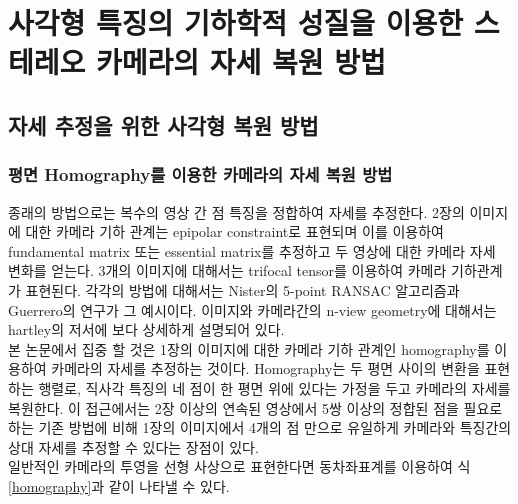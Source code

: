 \documentclass[master,korean,final]{cbnu-ecs}
\begin{document}
\newpage
\chapter{사각형 특징의 기하학적 성질을 이용한 스테레오 카메라의 자세 복원 방법}

\section{자세 추정을 위한 사각형 복원 방법}
\subsection{평면 Homography를 이용한 카메라의 자세 복원 방법}

종래의 방법으로는 복수의 영상 간 점 특징을 정합하여 자세를 추정한다. 2장의 이미지에 대한 카메라 기하 관계는 epipolar constraint로 표현되며 이를 이용하여 fundamental matrix 또는 essential matrix를 추정하고 두 영상에 대한 카메라 자세 변화를 얻는다. 3개의 이미지에 대해서는 trifocal tensor를 이용하여 카메라 기하관계가 표현된다. 각각의 방법에 대해서는 Nister의 5-point RANSAC 알고리즘\cite{Nister2005}과 Guerrero의 연구\cite{Guerrero2008}가 그 예시이다. 이미지와 카메라간의 n-view geometry에 대해서는 hartley의 저서\cite{Hartley2003}에 보다 상세하게 설명되어 있다.\\
본 논문에서 집중 할 것은 1장의 이미지에 대한 카메라 기하 관계인 homography를 이용하여 카메라의 자세를 추정하는 것이다. Homography는 두 평면 사이의 변환을 표현하는 행렬로, 직사각 특징의 네 점이 한 평면 위에 있다는 가정을 두고 카메라의 자세를 복원한다. 이 접근에서는 2장 이상의 연속된 영상에서 5쌍 이상의 정합된 점을 필요로 하는 기존 방법에 비해 1장의 이미지에서 4개의 점 만으로 유일하게 카메라와 특징간의 상대 자세를 추정할 수 있다는 장점이 있다. \\
일반적인 카메라의 투영을 선형 사상으로 표현한다면 동차좌표계를 이용하여 식 \eqref{homography}과 같이 나타낼 수 있다.
\end{document}
